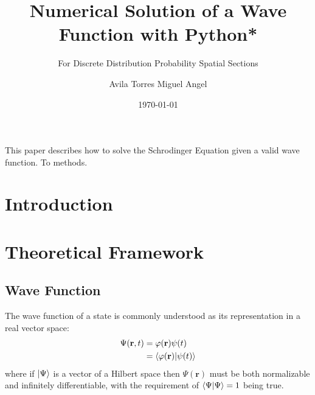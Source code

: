 \documentclass{aa}%
\begin{document}
\title{Numerical Solution of a Wave Function with Python*}

\subtitle{For Discrete Distribution Probability Spatial Sections}

\author{Avila Torres Miguel Angel
}


\date{\today}


\abstract
{This paper describes how to solve the Schrodinger Equation given a valid wave function.}
{To }
{methods.}
{}
{}


\maketitle

\section{Introduction}

\section{Theoretical Framework}
\subsection{Wave Function}
The wave function of a state is commonly understood as its representation in a real vector space:
\begin{align}
	\Psi(\mathbf{r},t) &= \varphi(\mathbf{r})\psi(t)\\
	&= \braket{\varphi(\mathbf{r})}{\psi(t)}
\end{align}
where if $\ket{\Psi}$ is a vector of a Hilbert space then $\Psi(\mathbf{r})$ must be both normalizable and infinitely differentiable, with the requirement of $\braket{\Psi}{\Psi} = 1$ being true.\cite{wave}
\end{document}
